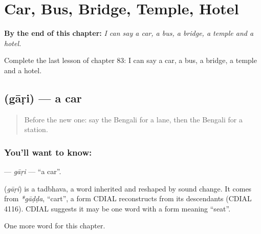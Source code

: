 
\chapter{Car, Bus, Bridge, Temple, Hotel}
\label{ch:bn-car-bus-bridge-temple-hotel}

\begin{chapteropening}
\textbf{By the end of this chapter:} \emph{I can say a car, a bus, a bridge, a temple and a hotel.}

Complete the last lesson of chapter 83: I can say a car, a bus, a bridge, a temple and a hotel.
\end{chapteropening}

\section[\texorpdfstring{\bn{গাড়ি} (gāṛi)}{গাড়ি (gāṛi)}]{ (gāṛi) — a car}

\label{lesson:BN-C83-gari}



\begin{quote}
Before the new one: say the Bengali for a lane, then the Bengali for a station.
\end{quote}

\subsection*{You'll want to know: }
\textbf{} — \emph{gāṛi} — \textquotedblleft{}a car\textquotedblright{}.

\begin{cousinweb}
\textbf{} (\emph{gāṛi}) is a tadbhava, a word inherited and reshaped by sound change. It comes from \emph{*gāḍḍa}, \textquotedblleft{}cart\textquotedblright{}, a form CDIAL reconstructs from its descendants (CDIAL 4116). CDIAL suggests it may be one word with a form meaning \textquotedblleft{}seat\textquotedblright{}.
\end{cousinweb}

\begin{grammarlens}[title={What you've built}]
One more word for this chapter.
\end{grammarlens}

